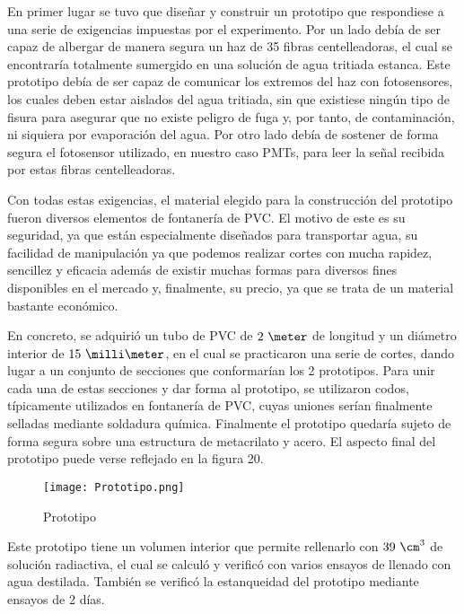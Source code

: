 En primer lugar se tuvo que diseñar y construir un prototipo que respondiese a una serie de exigencias impuestas por el experimento. Por un lado  debía de ser capaz de albergar de manera segura  un haz de 35 fibras centelleadoras, el cual se encontraría totalmente sumergido en una solución de agua tritiada estanca. Este prototipo debía de ser capaz de comunicar los extremos del haz con fotosensores, los cuales deben estar aislados del agua tritiada, sin que existiese ningún tipo de fisura para asegurar que no existe peligro de fuga y, por tanto, de contaminación, ni siquiera por evaporación del agua. Por otro lado debía de sostener de forma segura el fotosensor utilizado, en nuestro caso PMTs, para leer la señal recibida por estas fibras centelleadoras.

Con todas estas exigencias, el material elegido para la construcción del prototipo fueron diversos elementos de fontanería de PVC. El motivo de este es su seguridad, ya que están especialmente diseñados para transportar  agua, su facilidad de manipulación ya que podemos realizar cortes con mucha rapidez, sencillez y eficacia además de existir muchas formas para diversos fines disponibles en el mercado y, finalmente, su precio, ya que se trata de un material bastante económico. 

En concreto, se adquirió un tubo de PVC de $2~\meter$ de longitud y un diámetro interior de $15~\milli\meter$, en el cual se practicaron una serie de cortes, dando lugar a un conjunto de secciones que conformarían los 2 prototipos. Para unir cada una de estas secciones y dar forma al prototipo, se utilizaron codos, típicamente utilizados en fontanería de PVC, cuyas uniones serían finalmente selladas mediante soldadura química. Finalmente el prototipo quedaría sujeto de forma segura sobre una estructura de metacrilato y acero. El aspecto final del prototipo puede verse reflejado en la figura 20.

\begin{figure}[hbtp]
\centering
\texttt{[image: Prototipo.png]}
\caption{ Prototipo\label{prototipo}}
\end{figure}

Este prototipo tiene un volumen interior que permite rellenarlo con   $39~\cm^3$ de solución radiactiva, el cual se calculó y verificó con varios ensayos de llenado con agua destilada. También se verificó la estanqueidad del prototipo mediante ensayos de 2 días. 


